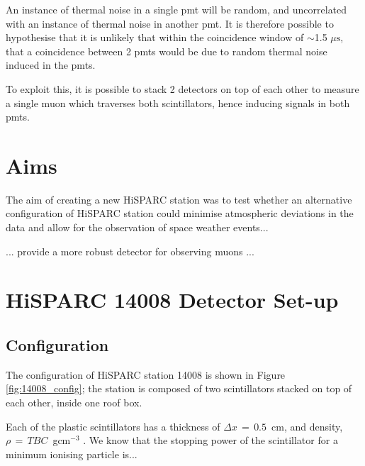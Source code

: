 An instance of thermal noise in a single \gls{pmt} will be random, and uncorrelated with an instance of thermal noise in another \gls{pmt}. It is therefore possible to hypothesise that it is unlikely that within the coincidence window of $\sim$1.5 $\mu \mathrm{s}$, that a coincidence between 2 \glspl{pmt} would be due to random thermal noise induced in the \glspl{pmt}.

To exploit this, it is possible to stack 2 detectors on top of each other to measure a single muon which traverses both scintillators, hence inducing signals in both \glspl{pmt}.



\section{Aims}\label{sec:HS_14008_aims}

The aim of creating a new HiSPARC station was to test whether an alternative configuration of HiSPARC station could minimise atmospheric deviations in the data and allow for the observation of space weather events...

... provide a more robust detector for observing muons ...



\section{HiSPARC 14008 Detector Set-up}\label{sec:HiSPARC_14008}


\subsection{Configuration}

The configuration of HiSPARC station 14008 is shown in Figure \ref{fig:14008_config}; the station is composed of two scintillators stacked on top of each other, inside one roof box. 

Each of the plastic scintillators has a thickness of $\Delta x \, = \, 0.5$~cm, and density, $\rho \, = \, TBC$~gcm$^{-3}$ . We know that the stopping power of the scintillator for a minimum ionising particle is... %

